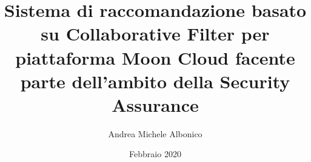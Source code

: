 \documentclass{beamer}
\title[]{Sistema di raccomandazione basato su Collaborative Filter per piattaforma Moon Cloud 
facente parte dell'ambito della Security Assurance}
\author{Andrea Michele Albonico}
\date{ Febbraio 2020}
\begin{document}
\frame{\titlepage}


\end{document}
